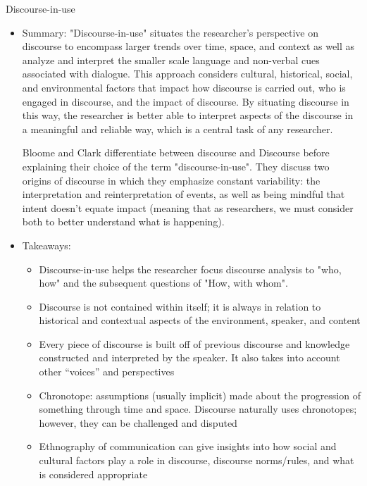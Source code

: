 \documentclass{TC}
\begin{document}
Discourse-in-use \parencite{bloome_discourse--use_2006}

\begin{itemize}
\item Summary: 
"Discourse-in-use" situates the researcher's perspective on discourse to encompass larger trends over time, space, and context as well as analyze and interpret the smaller scale language and non-verbal cues associated with dialogue. This approach considers cultural, historical, social, and environmental factors that impact how discourse is carried out, who is engaged in discourse, and the impact of discourse. By situating discourse in this way, the researcher is better able to interpret aspects of the discourse in a meaningful and reliable way, which is a central task of any researcher.

Bloome and Clark differentiate between discourse and Discourse before explaining their choice of the term "discourse-in-use". They discuss two origins of discourse in which they emphasize constant variability: the interpretation and reinterpretation of events, as well as being mindful that intent doesn't equate impact (meaning that as researchers, we must consider both to better understand what is happening). 

\item Takeaways:
\begin{itemize}
\item Discourse-in-use helps the researcher focus discourse analysis to "who, how" and the subsequent questions of "How, with whom".  
\item Discourse is not contained within itself; it is always in relation to historical and contextual aspects of the environment, speaker, and content
\item Every piece of discourse is built off of previous discourse and knowledge constructed and interpreted by the speaker. It also takes into account other “voices” and perspectives
\item Chronotope: assumptions (usually implicit) made about the progression of something through time and space. Discourse naturally uses chronotopes; however, they can be challenged and disputed
\item Ethnography of communication can give insights into how social and cultural factors play a role in discourse, discourse norms/rules, and what is considered appropriate
	\begin{itemize}
	

\end{itemize}
\end{itemize}
\end{itemize}
\end{document}
